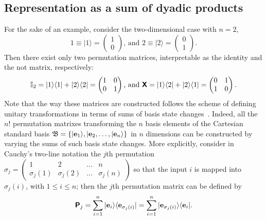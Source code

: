 \subsection{Representation as a sum of dyadic products}

For the sake of an example, consider the two-dimensional case with $n=2$,
\begin{equation}
1 \equiv \vert 1 \rangle = \begin{pmatrix}1\\0\end{pmatrix}
\textrm{, and }
2 \equiv \vert 2 \rangle = \begin{pmatrix}0\\1\end{pmatrix}.
\end{equation}
Then there exist only two permutation matrices, interpretable as the identity and the not matrix, respectively:
\begin{equation}
{\Bbb I}_2  = \vert 1 \rangle \langle 1 \vert + \vert 2 \rangle \langle 2 \vert = \begin{pmatrix}1&0\\0&1\end{pmatrix}
\textrm{, and }
\textsf{\textbf{X}}  = \vert 1 \rangle \langle 2 \vert + \vert 2 \rangle \langle 1 \vert = \begin{pmatrix}0&1\\1&0\end{pmatrix}
.
\end{equation}
Note that the way these matrices are constructed follows the scheme
of defining unitary transformations in terms of sums of basis state changes~\cite{Schwinger.60}.
Indeed, all the $n!$ permutation matrixes transforming the $n$ basis elements of the Cartesian standard basis
$\mathfrak{B}=\left\{ \vert {\bf e}_1 \rangle , \vert {\bf e}_2 , \ldots , \vert {\bf e}_n \rangle \right\}$
in $n$ dimensions can be constructed by  varying the sums of such basis state changes.
More explicitly,
consider in Cauchy's two-line notation
the $j$th permutation $\sigma_j =  \begin{pmatrix}1&2&\ldots&n \\ \sigma_j (1)&\sigma_j (2)&\ldots&\sigma_j (n)\end{pmatrix}$
so that the input $i$ is mapped into $\sigma_j (i)$, with $1\le i\le n$; then the $j$th permutation matrix can be defined by
\begin{equation}
\textsf{\textbf{P}}_j
=
\sum_{i=1}^n \vert {\bf e}_i \rangle \langle {\bf e}_{\sigma_j (i)} \vert
=
\sum_{i=1}^n \vert {\bf e}_{\sigma_j (i)} \rangle \langle {\bf e}_i \vert
.
\label{2016-pu-book-chapter-qm-pmg}
\end{equation}

